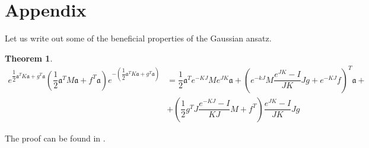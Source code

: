 \documentclass[12pt]{article}
\newtheorem{theorem}{Theorem}
\theoremstyle{definition}
\newcommand\Tr{\operatorname{Tr}}
\newcommand{\mf}[1]{\mathfrak{#1}}
\begin{document}
	
	
	\newpage
	
	
	\section{Appendix\label{App}}
	
	
	
	
	
	
%	
	
	Let us write out some of the beneficial properties of the Gaussian ansatz.
	
	\begin{theorem}
		\label{th:KvFor}
		\begin{align*}
			\label{eq:KvFor}
			e^{\dfrac{1}{2}\mf{a}^TK\mf{a} + g^T\mf{a}}(\dfrac{1}{2}\mf{a}^TM\mf{a} + f^T\mf{a})e^{-(\dfrac{1}{2}\mf{a}^TK\mf{a} + g^T\mf{a})} &= \dfrac{1}{2}\mf{a}^Te^{-KJ}Me^{JK}\mf{a} + \left(e^{-kJ}M\dfrac{e^{JK}-I}{JK}Jg + e^{-KJ}f\right)^T\mf{a} + \nonumber\\
			&+ \left(\dfrac{1}{2}g^TJ\dfrac{e^{-KJ}-I}{KJ}M + f^T\right)\dfrac{e^{JK} - I}{JK}Jg&
		\end{align*}
	\end{theorem}
	The proof can be found in \cite{Dis}. 
	
\end{document}
